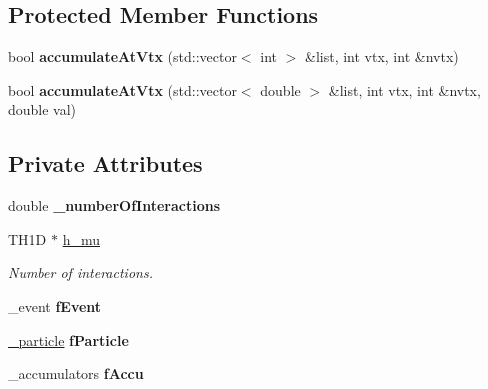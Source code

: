 \subsection*{Protected Member Functions}
\begin{CompactItemize}
\item 
\hypertarget{classHistGroupEvent_f2d4bb197510271d8d00bf3c676839e0}{
bool \textbf{accumulate\-At\-Vtx} (std::vector$<$ int $>$ \&list, int vtx, int \&nvtx)}
\label{classHistGroupEvent_f2d4bb197510271d8d00bf3c676839e0}

\item 
\hypertarget{classHistGroupEvent_54c4531e8a53b1c83fc1cc420dc5145d}{
bool \textbf{accumulate\-At\-Vtx} (std::vector$<$ double $>$ \&list, int vtx, int \&nvtx, double val)}
\label{classHistGroupEvent_54c4531e8a53b1c83fc1cc420dc5145d}

\end{CompactItemize}
\subsection*{Private Attributes}
\begin{CompactItemize}
\item 
\hypertarget{classHistGroupEvent_ff01523c9a6c0f05b77f312120287c19}{
double \textbf{\_\-number\-Of\-Interactions}}
\label{classHistGroupEvent_ff01523c9a6c0f05b77f312120287c19}

\item 
\hypertarget{classHistGroupEvent_33e7495b55c2933de6cba2e77ed422bf}{
TH1D $\ast$ \hyperlink{classHistGroupEvent_33e7495b55c2933de6cba2e77ed422bf}{h\_\-mu}}
\label{classHistGroupEvent_33e7495b55c2933de6cba2e77ed422bf}

\begin{CompactList}\small\item\em Number of interactions. \item\end{CompactList}\item 
\hypertarget{classHistGroupEvent_47459438b1fdab877499af52b5766ce0}{
\_\-event \textbf{f\-Event}}
\label{classHistGroupEvent_47459438b1fdab877499af52b5766ce0}

\item 
\hypertarget{classHistGroupEvent_a8de0874c2680ae678e1f9e2788c711a}{
\hyperlink{structHistGroupEvent_1_1__particle}{\_\-particle} \textbf{f\-Particle}}
\label{classHistGroupEvent_a8de0874c2680ae678e1f9e2788c711a}

\item 
\hypertarget{classHistGroupEvent_a2d2cc6e69e5165c791e2d564ca1b6cf}{
\_\-accumulators \textbf{f\-Accu}}
\label{classHistGroupEvent_a2d2cc6e69e5165c791e2d564ca1b6cf}

\end{CompactItemize}
